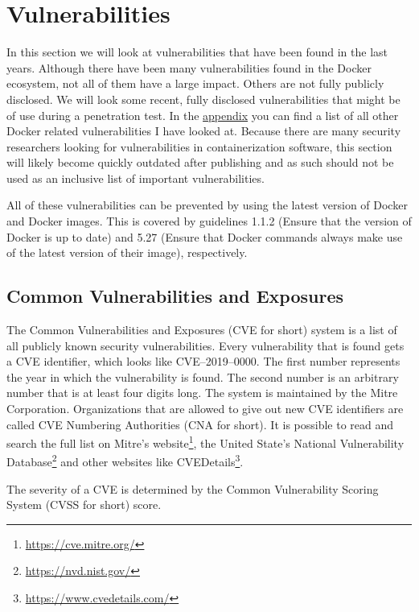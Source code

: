 \section{Vulnerabilities}\label{section:vulnerabilities}
In this section we will look at vulnerabilities that have been found in the last years. Although there have been many vulnerabilities found in the Docker ecosystem, not all of them have a large impact. Others are not fully publicly disclosed. We will look some recent, fully disclosed vulnerabilities that might be of use during a penetration test. In the \hyperref[appendix:CVE-List]{appendix} you can find a list of all other Docker related vulnerabilities I have looked at.
Because there are many security researchers looking for vulnerabilities in containerization software, this section will likely become quickly outdated after publishing and as such should not be used as an inclusive list of important vulnerabilities.

\hfill

All of these vulnerabilities can be prevented by using the latest version of Docker and Docker images. This is covered by guidelines 1.1.2 (Ensure that the version of Docker is up to date) and 5.27 (Ensure that Docker commands always make use of the latest version of their image), respectively.

\subsection*{Common Vulnerabilities and Exposures}
The Common Vulnerabilities and Exposures (CVE for short) system is a list of all publicly known security vulnerabilities. Every vulnerability that is found gets a CVE identifier, which looks like CVE--2019--0000. The first number represents the year in which the vulnerability is found. The second number is an arbitrary number that is at least four digits long. The system is maintained by the Mitre Corporation. Organizations that are allowed to give out new CVE identifiers are called CVE Numbering Authorities (CNA for short). It is possible to read and search the full list on Mitre's website\footnote{\url{https://cve.mitre.org/}}, the United State's National Vulnerability Database\footnote{\url{https://nvd.nist.gov/}} and other websites like CVEDetails\footnote{\url{https://www.cvedetails.com/}}.

The severity of a CVE is determined by the Common Vulnerability Scoring System (CVSS for short) score.








